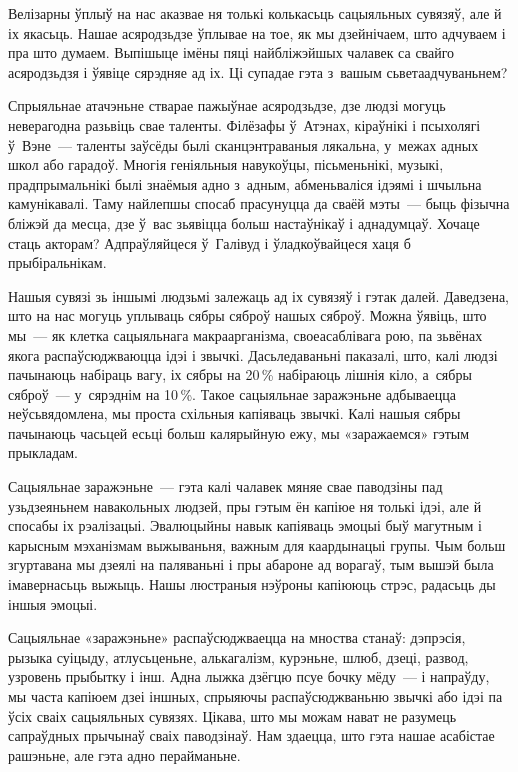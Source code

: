 Велізарны ўплыў на нас аказвае ня толькі колькасьць сацыяльных сувязяў, але й іх якасьць. Нашае асяродзьдзе ўплывае на тое, як мы дзейнічаем, што адчуваем і пра што думаем. Выпішыце імёны пяці найбліжэйшых чалавек са свайго асяродзьдзя і ўявіце сярэдняе ад іх. Ці супадае гэта з~вашым сьветаадчуваньнем?

Спрыяльнае атачэньне стварае пажыўнае асяродзьдзе, дзе людзі могуць неверагодна разьвіць свае таленты. Філёзафы ў~Атэнах, кіраўнікі і псыхолягі ў~Вэне~--- таленты заўсёды былі сканцэнтраваныя лякальна, у~межах адных школ або гарадоў. Многія геніяльныя навукоўцы, пісьменьнікі, музыкі, прадпрымальнікі былі знаёмыя адно з~адным, абменьваліся ідэямі і шчыльна камунікавалі. Таму найлепшы спосаб прасунуцца да сваёй мэты~--- быць фізычна бліжэй да месца, дзе ў~вас зьявіцца больш настаўнікаў і аднадумцаў. Хочаце стаць акторам? Адпраўляйцеся ў~Галівуд і ўладкоўвайцеся хаця б прыбіральнікам.

Нашыя сувязі зь іншымі людзьмі залежаць ад іх сувязяў і гэтак далей. Даведзена, што на нас могуць уплываць сябры сяброў нашых сяброў. Можна ўявіць, што мы~--- як клетка сацыяльнага макраарганізма, своеасаблівага рою, па зьвёнах якога распаўсюджваюцца ідэі і звычкі. Дасьледаваньні паказалі, што, калі людзі пачынаюць набіраць вагу, іх сябры на 20\,\% набіраюць лішнія кіло, а~сябры сяброў~--- у~сярэднім на 10\,\%. Такое сацыяльнае заражэньне адбываецца неўсьвядомлена, мы проста схільныя капіяваць звычкі. Калі нашыя сябры пачынаюць часьцей есьці больш калярыйную ежу, мы «заражаемся» гэтым прыкладам.

Сацыяльнае заражэньне~--- гэта калі чалавек мяняе свае паводзіны пад узьдзеяньнем навакольных людзей, пры гэтым ён капіюе ня толькі ідэі, але й спосабы іх рэалізацыі. Эвалюцыйны навык капіяваць эмоцыі быў магутным і карысным мэханізмам выжываньня, важным для каардынацыі групы. Чым больш згуртавана мы дзеялі на паляваньні і пры абароне ад ворагаў, тым вышэй была імавернасьць выжыць. Нашы люстраныя нэўроны капіююць стрэс, радасьць ды іншыя эмоцыі.

Сацыяльнае «заражэньне» распаўсюджваецца на мноства станаў: дэпрэсія, рызыка суіцыду, атлусьценьне, алькагалізм, курэньне, шлюб, дзеці, развод, узровень прыбытку і інш. Адна лыжка дзёгцю псуе бочку мёду~--- і напраўду, мы часта капіюем дзеі іншных, спрыяючы распаўсюджваньню звычкі або ідэі па ўсіх сваіх сацыяльных сувязях. Цікава, што мы можам нават не разумець сапраўдных прычынаў сваіх паводзінаў. Нам здаецца, што гэта нашае асабістае рашэньне, але гэта адно перайманьне.

